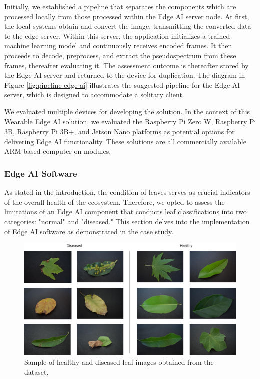 Initially, we established a pipeline that separates the components which are processed locally from those processed within the Edge AI server node. At first, the local systems obtain and convert the image, transmitting the converted data to the edge server. Within this server, the application initializes a trained machine learning model and continuously receives encoded frames. It then proceeds to decode, preprocess, and extract the pseudospectrum from these frames, thereafter evaluating it. The assessment outcome is thereafter stored by the Edge AI server and returned to the device for duplication. The diagram in Figure \ref{fig:pipeline-edge-ai} illustrates the suggested pipeline for the Edge AI server, which is designed to accommodate a solitary client.

We evaluated multiple devices for developing the solution. In the context of this Wearable Edge AI solution, we evaluated the Raspberry Pi Zero W, Raspberry Pi 3B, Raspberry Pi 3B+, and Jetson Nano platforms as potential options for delivering Edge AI functionality. These solutions are all commercially available ARM-based computer-on-modules.

\subsubsection{Edge AI Software}

As stated in the introduction, the condition of leaves serves as crucial indicators of the overall health of the ecosystem. Therefore, we opted to assess the limitations of an Edge AI component that conducts leaf classifications into two categories: "normal" and "diseased." This section delves into the implementation of Edge AI software as demonstrated in the case study.

\begin{figure}[h!]
    \centering
    \includegraphics[width = .9\linewidth]{Figures/leaves.png}
    \caption{Sample of healthy and diseased leaf images obtained from the dataset.}
    \label{fig:healthy-and-diseased-leaves}
\end{figure}

